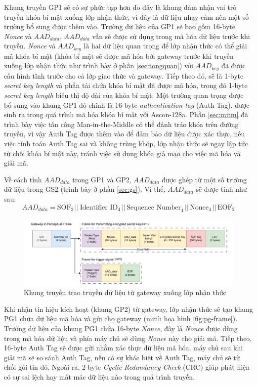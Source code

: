 Khung truyền GP1 sẽ có sự phức tạp hơn do đây là khung đảm nhận vai trò truyền khóa bí mật xuống lớp nhận thức, vì đây là dữ liệu nhạy cảm nên một số trường bổ sung được thêm vào. Trường dữ liệu của GP1 sẽ bao gồm 16-byte \textit{Nonce} và $AAD_{data}$, $AAD_{data}$ vẫn sẽ được sử dụng trong mã hóa dữ liệu trước khi truyền. \textit{Nonce} và $AAD_{key}$ là hai dữ liệu quan trọng để lớp nhận thức có thể giải mã khóa bí mật (khóa bí mật sẽ được mã hóa bởi gateway trước khi truyền xuống lớp nhận thức như trình bày ở phần \ref{sec:tongquan}) với $AAD_{key}$ đã được cấu hình tĩnh trước cho cả lớp giao thức và gateway. Tiếp theo đó, sẽ là 1-byte \textit{secret key length} và phần tải chứa khóa bí mật đã được mã hóa, trong đó 1-byte \textit{secret key length} biểu thị độ dài của khóa bí mật. Một trường quan trọng được bổ sung vào khung GP1 đó chính là 16-byte \textit{authentication tag} (Auth Tag), được sinh ra trong quá trình mã hóa khóa bí mật với Ascon-128a. Phần \ref{sec:mitm} đã trình bày việc tấn công Man-in-the-Middle có thể đánh tráo khóa trên đường truyền, vì vậy Auth Tag được thêm vào để đảm bảo dữ liệu được xác thực, nếu việc tính toán Auth Tag sai và không trùng khớp, lớp nhận thức sẽ ngay lập tức từ chối khóa bí mật này, tránh việc sử dụng khóa giả mạo cho việc mã hóa và giải mã.

Về cách tính $AAD_{data}$ trong GP1 và GP2, $AAD_{data}$ được ghép từ một số trường dữ liệu trong GS2 (trình bày ở phần \ref{sec:gs}). Vì thế, $AAD_{data}$ sẽ được tính như sau:
\[
\text{$AAD_{data}$} = \text{SOF}_{2} \, || \, \text{Identifier ID}_{4} \, || \, \text{Sequence Number}_{4} \, || \, \text{Nonce}_{4} \, || \, \text{EOF}_{2}
\]

\begin{figure}[h]
    \centering
    \includegraphics[width=1\linewidth]{gp-frame.pdf}
    \caption{Khung truyền trao truyền dữ liệu từ gateway xuống lớp nhận thức}
    \label{fig:gp}
\end{figure}

Khi nhận tín hiệu kích hoạt (khung GP2) từ gateway, lớp nhận thức sẽ tạo khung PG1 chứa dữ liệu mã hóa và gửi cho gateway (minh họa hình \ref{fig:pg-frame}). Trường dữ liệu của khung PG1 chứa 16-byte \textit{Nonce}, đây là \textit{Nonce} được dùng trong mã hóa dữ liệu và phía máy chủ sẽ dùng \textit{Nonce} này cho giải mã. Tiếp theo, 16-byte Auth Tag sẽ được gửi nhằm xác thực dữ liệu mã hóa, máy chủ sau khi giải mã sẽ so sánh Auth Tag, nếu có sự khác biệt về Auth Tag, máy chủ sẽ từ chối gói tin đó. Ngoài ra, 2-byte \textit{Cyclic Redundancy Check} (CRC) giúp phát hiện có sự sai lệch hay mất mác dữ liệu nào trong quá trình truyền.

